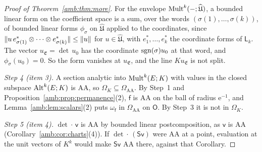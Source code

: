 \begin{proof}[Proof of Theorem~\ref{amb:thm:more}]
For the envelope $\operatorname{Mult}^k(-;\widehat{\mathfrak U})$, a bounded linear form on the coefficient space is a sum, over the words $(\sigma(1),\dots,\sigma(k))$, of bounded linear forms $\phi_\sigma$ on $\widehat{\mathfrak U}$ applied to the coordinates, since $\lVert u\,e^*_{\sigma(1)}\otimes\dots\otimes e^*_{\sigma(k)}\rVert\le\lVert u\rVert$ for $u\in\widehat{\mathfrak U}$, with $e^*_1,\dots,e^*_k$ the coordinate forms of $\mathsf L_k$. The vector $u_{\mathfrak E}=\det\,u_0$ has the coordinate $\operatorname{sgn}(\sigma)u_0$ at that word, and $\phi_\sigma(u_0)=0$. So the form vanishes at $u_{\mathfrak E}$, and the line $Ku_{\mathfrak E}$ is not split.

\emph{Step 4 (item 3).} A section analytic into $\operatorname{Mult}^k(E;K)$ with values in the closed subspace $\operatorname{Alt}^k(E;K)$ is AA, so $\Omega_K\subseteq\Omega_{\mathrm{AA}}$. By Step~1 and Proposition~\ref{amb:prop:permanence}(2), $\mathsf f$ is AA on the ball of radius $\mathrm e^{-1}$, and Lemma~\ref{amb:lem:scalars}(2) puts $\omega_{\mathsf f}$ in $\Omega_{\mathrm{AA}}$ on $\mathsf O$. By Step~3 it is not in $\Omega_K$.

\emph{Step 5 (item 4).} $\det\cdot\,\mathsf v$ is AA by bounded linear postcomposition, as $\mathsf v$ is AA (Corollary~\ref{amb:cor:charts}(4)). If $\det\cdot\,(\mathsf S\mathsf v)$ were AA at a point, evaluation at the unit vectors of $K^k$ would make $\mathsf S\mathsf v$ AA there, against that Corollary.
\end{proof}

